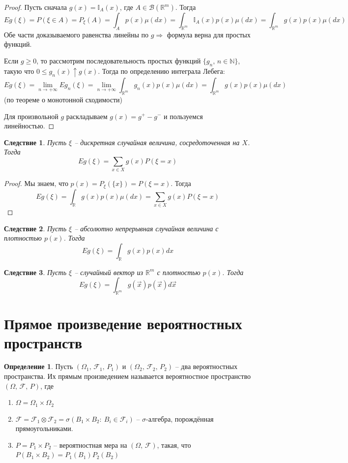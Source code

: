 \documentclass[a4paper,12pt]{article}
\renewcommand{\leq}{\ensuremath{\leqslant}}
\renewcommand{\geq}{\ensuremath{\geqslant}}
\theoremstyle{plain}
\newtheorem*{corollary}{Следствие}
\theoremstyle{definition}
\newtheorem{definition}{Определение}[section]
\theoremstyle{remark}
\begin{document}
\begin{proof}
	Пусть сначала $g(x) = \mathbb{I}_A(x)$, где $A \in \mathcal{B}(\mathbb{R}^m)$. Тогда
	\[
		Eg(\xi) = P(\xi \in A) = P_\xi(A) = \int_Ap(x)\mu(dx) = \int_{\mathbb{R}^m}\mathbb{I}_A(x)p(x)\mu(dx) = \int_{\mathbb{R}^m}g(x)p(x)\mu(dx)
	\]
	Обе части доказываемого равенства линейны по $g \Rightarrow$ формула верна для простых функций.

	Если $g \geq 0$, то рассмотрим последовательность простых функций $\{g_n,\, n \in \mathbb{N}\}$, такую что $0 \leq g_n(x) \uparrow g(x)$. Тогда по определению интеграла Лебега:
	\[
		Eg(\xi) = \lim_{n \to +\infty}Eg_n(\xi) = \lim_{n \to +\infty} \int_{\mathbb{R}^m}g_n(x)p(x)\mu(dx) = \int_{\mathbb{R}^m}g(x)p(x)\mu(dx)
	\]
	(по теореме о монотонной сходимости)

	Для произвольной $g$ раскладываем $g(x) = g^+ - g^-$ и пользуемся линейностью.
\end{proof}

\begin{corollary}
	Пусть $\xi$ -- дискретная случайная величина, сосредоточенная на $X$. Тогда
	\[Eg(\xi) = \sum_{x \in X}g(x)P(\xi = x)\]
\end{corollary}

\begin{proof}
	Мы знаем, что $p(x) = P_\xi(\{x\}) = P(\xi = x)$. Тогда
	\[Eg(\xi) = \int_\mathbb{R}g(x)p(x)\mu(dx) = \sum_{x \in X} g(x)P(\xi = x)\]
\end{proof}

\begin{corollary}
	Пусть $\xi$ -- абсолютно непрерывная случайная величина с плотностью $p(x)$. Тогда
	\[Eg(\xi) = \int_\mathbb{R} g(x)p(x)dx\]
\end{corollary}

\begin{corollary}
	Пусть $\xi$ -- случайный вектор из $\mathbb{R}^m$ с плотностью $p(x)$. Тогда
	\[Eg(\xi) = \int_{\mathbb{R}^m}g(\vec{x})p(\vec{x})d\vec{x}\]
\end{corollary}

\section{Прямое произведение вероятностных пространств}
\begin{definition}
	Пусть $(\Omega_1,\, \mathcal{F}_1,\, P_1)$ и $(\Omega_2,\, \mathcal{F}_2,\, P_2)$ -- два вероятностных пространства. Их прямым произведением называется вероятностное пространство $(\Omega,\, \mathcal{F},\, P)$, где
	\begin{enumerate}
		\item $\Omega = \Omega_1 \times \Omega_2$
		\item $\mathcal{F} = \mathcal{F}_1 \otimes \mathcal{F}_2 = \sigma(B_1 \times B_2:\: B_i \in \mathcal{F}_i)$ -- $\sigma$-алгебра, порождённая прямоугольниками.
		\item $P = P_1 \times P_2$ -- вероятностная мера на $(\Omega,\, \mathcal{F})$, такая, что $P(B_1 \times B_2) = P_1(B_1)P_2(B_2)$
	\end{enumerate}
\end{definition}
\end{document}
